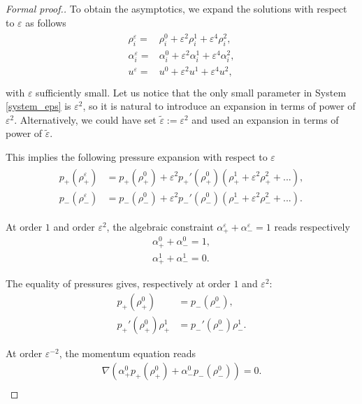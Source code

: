 \documentclass[11pt, twoside, a4paper]{article}
\theoremstyle{plain}
\theoremstyle{remark}
\numberwithin{equation}{section}
\renewcommand{\epsilon}{\varepsilon}
\newcommand{\eps}{\varepsilon}
\newcommand{\ap}{\alpha_+}
\newcommand{\am}{\alpha_-}
\begin{document}
\begin{proof} [Formal proof.]

To obtain the asymptotics, we expand the solutions with respect to $\eps$ as follows
\begin{align}
    \begin{array}{cc}\label{expansion}
        \rho_i^\eps =& \rho_i^0 + \eps^2 \rho_i^1 + \eps^4 \rho_i^2,\\
        \alpha_i^\eps =& \alpha_i^0 + \eps^2 \alpha_i^1 + \eps^4 \alpha_i^2,\\
        u^\eps =& u^0 + \eps^2 u^1 + \eps^4 u^2,\\
    \end{array}
\end{align}
with $\eps$ sufficiently small. Let us notice that the only small parameter in System \eqref{system_eps} is $\eps^2$, so it is natural to introduce an expansion in terms of power of $\eps^2$. Alternatively, we could have set $\tilde \epsilon:=\eps^2$ and used an expansion in terms of power of $\tilde \eps$.




This implies the following pressure expansion with respect to $\eps$
\begin{align}
    \begin{array}{cc}\label{expansionp}
        p_+(\rho_+^\eps) &= p_+(\rho_+^0) + \eps^2 p_+'(\rho_+^0) (\rho_+^1 + \eps^2 \rho_+^2+...),\\
        p_-(\rho_-^\eps) &= p_-(\rho_-^0) + \eps^2 p_-'(\rho_-^0)(\rho_-^1 + \eps^2 \rho_-^2+...).
    \end{array}
\end{align}

At order $1$ and order $\eps^2$, the algebraic constraint $\ap^\eps + \am^\eps =1$ reads respectively
\begin{align}
    \alpha_+^0 + \alpha_-^0 = 1, \label{alpha0}\\
    \ap^1 + \am^1 = 0.\label{alpha1}
\end{align}

The equality of pressures gives, respectively at order $1$ and $\eps^2$:
\begin{align}
    p_+(\rho_+^0) &= p_-(\rho_-^0),\label{p0} \\
    p_+'(\rho_+^0) \rho_+^1 &= p_-'(\rho_-^0)\rho_-^1. \label{p1}
\end{align}

At order $\eps^{-2}$, the momentum equation reads
\begin{align*}
    \nabla (\alpha_+^{0}p_+(\rho_+^0)+\alpha_-^0p_-(\rho_-^0)) =0.\\ \nonumber
\end{align*}


\end{proof}
\end{document}
